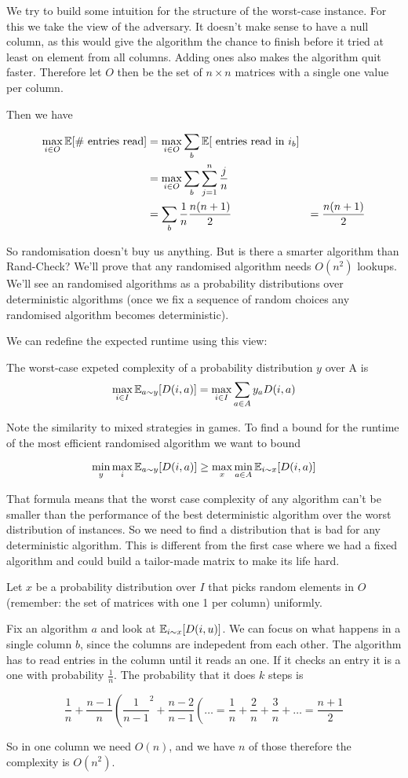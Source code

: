 We try to build some intuition for the structure of the worst-case instance. For this we take the view of the adversary.
It doesn't make sense to have a null column, as this would give the algorithm the chance to finish before it tried at least on element from all columns. Adding ones also makes the algorithm quit faster. Therefore let $O$ then be the set of $n\times n$ matrices with a single one value per column.

Then we have

\begin{align*}
\max_{i\in O} \mathbb{E}[\text{\# entries read}] &= \max_{i\in O} \sum_b \mathbb{E}[\text{ entries read in } i_b]\\
	&=\max_{i\in O}\sum_b \sum_{j=1}^n \frac jn\\
	&=\sum_b \frac 1n \frac{n(n+1)}{2} 
	&=\frac{n(n+1)}{2}
\end{align*}

So randomisation doesn't buy us anything. But is there a smarter algorithm than {\sc Rand-Check}? We'll prove that any randomised algorithm needs $O(n^2)$ lookups. We'll see an randomised algorithms as a probability distributions over deterministic algorithms (once we fix a sequence of random choices any randomised algorithm becomes deterministic).

We can redefine the expected runtime using this view:

\begin{Def} The worst-case expeted complexity of a probability distribution $y$ over A is
\[\max_{i\in I} \mathbb{E}_{a\sim y}[D(i,a)] = \max_{i\in I} \sum_{a\in A} y_a D(i,a)\]
\end{Def}

Note the similarity to mixed strategies in games. To find a bound for the runtime of the most efficient randomised algorithm we want to bound 

\[\min_y \max_i \mathbb{E}_{a\sim y}[D(i,a)] \geq \max_x\min_{a\in A} \mathbb{E}_{i\sim x}[D(i,a)]\]

That formula means that the worst case complexity of any algorithm can't be smaller than the performance of the best deterministic algorithm over the worst distribution of instances. So we need to find a distribution that is bad for any deterministic algorithm. This is different from the first case where we had a fixed algorithm and could build a tailor-made matrix to make its life hard.

Let $x$ be a probability distribution over $I$ that picks random elements in $O$ (remember: the set of matrices with one 1 per column) uniformly.

Fix an algorithm $a$ and look at $\mathbb{E}_{i\sim x}[D(i,u)]$. We can focus on what happens in a single column $b$, since the columns are indepedent from each other. The algorithm has to read entries in the column until it reads an one. If it checks an entry it is a one with probability $\frac{1}{n}$. The probability that it does $k$ steps is

\[\frac{1}{n} + \frac{n-1}{n}\left( \frac{1}{n-1}^2+\frac{n-2}{n-1}\left(\ldots = \frac{1}{n} + \frac 2n + \frac 3n + \right.\right.\ldots= \frac{n+1}{2}\]

So in one column we need $O(n)$, and we have $n$ of those therefore the complexity is $O(n^2)$.

